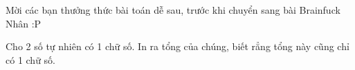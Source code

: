 Mời các bạn thưởng thức bài toán dễ sau, trước khi chuyển sang bài Brainfuck Nhân :P  

   Cho 2 số tự nhiên có 1 chữ số. In ra tổng của chúng, biết rẳng tổng này cũng chỉ có 1 chữ số.